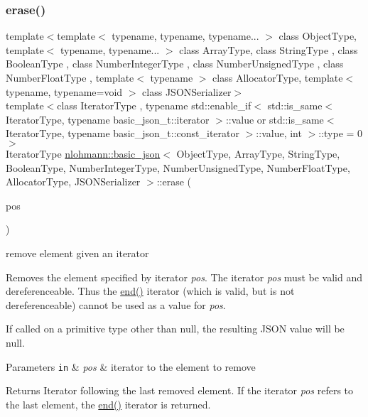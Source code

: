 \subsubsection{\texorpdfstring{erase()}{erase()}\hspace{0.1cm}{\footnotesize\ttfamily [1/4]}}
{\footnotesize\ttfamily template$<$template$<$ typename, typename, typename... $>$ class Object\+Type, template$<$ typename, typename... $>$ class Array\+Type, class String\+Type , class Boolean\+Type , class Number\+Integer\+Type , class Number\+Unsigned\+Type , class Number\+Float\+Type , template$<$ typename $>$ class Allocator\+Type, template$<$ typename, typename=void $>$ class J\+S\+O\+N\+Serializer$>$ \\
template$<$class Iterator\+Type , typename std\+::enable\+\_\+if$<$ std\+::is\+\_\+same$<$ Iterator\+Type, typename basic\+\_\+json\+\_\+t\+::iterator $>$\+::value or std\+::is\+\_\+same$<$ Iterator\+Type, typename basic\+\_\+json\+\_\+t\+::const\+\_\+iterator $>$\+::value, int $>$\+::type  = 0$>$ \\
Iterator\+Type \hyperlink{classnlohmann_1_1basic__json}{nlohmann\+::basic\+\_\+json}$<$ Object\+Type, Array\+Type, String\+Type, Boolean\+Type, Number\+Integer\+Type, Number\+Unsigned\+Type, Number\+Float\+Type, Allocator\+Type, J\+S\+O\+N\+Serializer $>$\+::erase (\begin{DoxyParamCaption}\item[{Iterator\+Type}]{pos }\end{DoxyParamCaption})\hspace{0.3cm}{\ttfamily [inline]}}



remove element given an iterator 

Removes the element specified by iterator {\itshape pos}. The iterator {\itshape pos} must be valid and dereferenceable. Thus the {\ttfamily \hyperlink{classnlohmann_1_1basic__json_a13e032a02a7fd8a93fdddc2fcbc4763c}{end()}} iterator (which is valid, but is not dereferenceable) cannot be used as a value for {\itshape pos}.

If called on a primitive type other than {\ttfamily null}, the resulting J\+S\+ON value will be {\ttfamily null}.


\begin{DoxyParams}[1]{Parameters}
\mbox{\tt in}  & {\em pos} & iterator to the element to remove \\
\hline
\end{DoxyParams}
\begin{DoxyReturn}{Returns}
Iterator following the last removed element. If the iterator {\itshape pos} refers to the last element, the {\ttfamily \hyperlink{classnlohmann_1_1basic__json_a13e032a02a7fd8a93fdddc2fcbc4763c}{end()}} iterator is returned.
\end{DoxyReturn}

